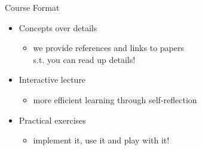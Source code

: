 \begin{frame}[c]{Course Format}

\begin{itemize}
	\item Concepts over details
	\begin{itemize}
	  \item we provide references and links to papers\\ s.t. you can read up details!
	\end{itemize}
	\smallskip
	\item Interactive lecture
	\begin{itemize}
	  \item more efficient learning through self-reflection
	\end{itemize}
	\smallskip
	\item Practical exercises
	\begin{itemize}
	  \item implement it, use it and play with it!
	\end{itemize}
\end{itemize}

\end{frame}
